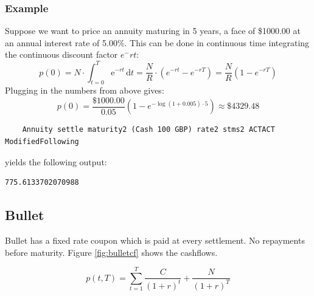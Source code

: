 \documentclass[11pt,a4paper]{article}
\numberwithin{equation}{section}
\begin{document}
	\subsubsection{Example}
	Suppose we want to price an annuity maturing in 5 years, a face of \$1000.00 at an annual interest rate of 5.00\%.
	This can be done in continuous time integrating the continuous discount factor $e^-rt$:
	\[
	p(0)=N\cdot \int_{t=0}^T \mathrm{e}^{-rt}\,\mathrm{d}t=\frac{N}{R}\cdot (e^{-rt}-e^{-rT})=\frac{N}{R}(1-e^{-rT})
	\]
	Plugging in the numbers from above gives:
	\[
	p(0)=\frac{\$1000.00}{0.05}(1-e^{-\log(1+0.005)\cdot 5})\approx \$4329.48
	\]
	\begin{lstlisting}
	Annuity settle maturity2 (Cash 100 GBP) rate2 stms2 ACTACT ModifiedFollowing
	\end{lstlisting}
	yields the following output:
	\FrameSep
	\begin{lstlisting}[style=Output]
	775.6133702070988
	\end{lstlisting}

	\subsection{Bullet}
	Bullet has a fixed rate coupon which is paid at every settlement. No repayments before maturity. Figure \ref{fig:bulletcf} shows the cashflows.

	\[ p(t,T) = \sum_{t=1}^{T}\frac{C}{(1+r)^t} + \frac{N}{(1+r)^T} \]
\end{document}
